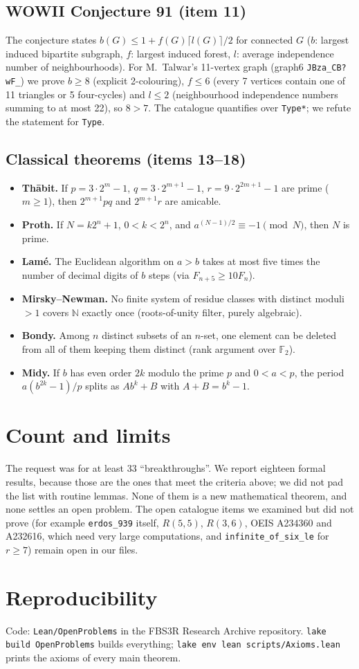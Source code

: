 \documentclass[11pt,a4paper]{article}
\newcommand{\lean}[1]{\texttt{#1}}
\begin{document}
\subsection{WOWII Conjecture 91 (item 11)}
The conjecture states $b(G)\le 1 + f(G)\lceil l(G)\rceil/2$ for connected $G$ ($b$: largest
induced bipartite subgraph, $f$: largest induced forest, $l$: average independence number of
neighbourhoods). For M.~Talwar's 11-vertex graph (graph6 \lean{JBza\_CB?wF\_}) we prove
$b\ge 8$ (explicit 2-colouring), $f\le 6$ (every 7 vertices contain one of 11 triangles or 5
four-cycles) and $l\le 2$ (neighbourhood independence numbers summing to at most 22), so
$8 > 7$. The catalogue quantifies over \lean{Type*}; we refute the statement for
\lean{Type}.

\subsection{Classical theorems (items 13--18)}
\begin{itemize}
\item \textbf{Th\=abit.} If $p=3\cdot2^{m}-1$, $q=3\cdot2^{m+1}-1$, $r=9\cdot2^{2m+1}-1$ are prime
  ($m\ge1$), then $2^{m+1}pq$ and $2^{m+1}r$ are amicable.
\item \textbf{Proth.} If $N=k2^n+1$, $0<k<2^n$, and $a^{(N-1)/2}\equiv-1\pmod N$, then $N$ is
  prime.
\item \textbf{Lam\'e.} The Euclidean algorithm on $a>b$ takes at most five times the number of
  decimal digits of $b$ steps (via $F_{n+5}\ge 10F_n$).
\item \textbf{Mirsky--Newman.} No finite system of residue classes with distinct moduli $>1$
  covers $\mathbb N$ exactly once (roots-of-unity filter, purely algebraic).
\item \textbf{Bondy.} Among $n$ distinct subsets of an $n$-set, one element can be deleted from
  all of them keeping them distinct (rank argument over $\mathbb F_2$).
\item \textbf{Midy.} If $b$ has even order $2k$ modulo the prime $p$ and $0<a<p$, the period
  $a(b^{2k}-1)/p$ splits as $A b^k + B$ with $A+B=b^k-1$.
\end{itemize}

\section{Count and limits}
The request was for at least 33 ``breakthroughs''. We report eighteen formal results, because
those are the ones that meet the criteria above; we did not pad the list with routine lemmas.
None of them is a new mathematical theorem, and none settles an open problem. The open
catalogue items we examined but did not prove (for example \lean{erdos\_939} itself, $R(5,5)$,
$R(3,6)$, OEIS A234360 and A232616, which need very large computations, and
\lean{infinite\_of\_six\_le} for $r\ge 7$) remain open in our files.

\section*{Reproducibility}
Code: \lean{Lean/OpenProblems} in the FBS3R Research Archive repository.
\lean{lake build OpenProblems} builds everything; \lean{lake env lean scripts/Axioms.lean}
prints the axioms of every main theorem.
\end{document}
